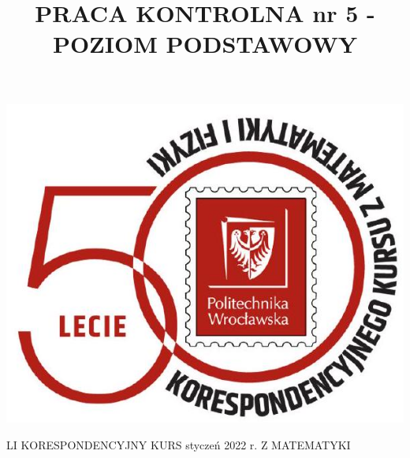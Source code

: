 \documentclass[10pt]{article}
\title{PRACA KONTROLNA nr 5 - POZIOM PODSTAWOWY }
\author{}
\date{}
\begin{document}
\maketitle
\begin{center}
\includegraphics[max width=\textwidth]{2024_11_16_709006e7376bc680c3a0g-1}
\end{center}

LI KORESPONDENCYJNY KURS styczeń 2022 r. Z MATEMATYKI
\end{document}
